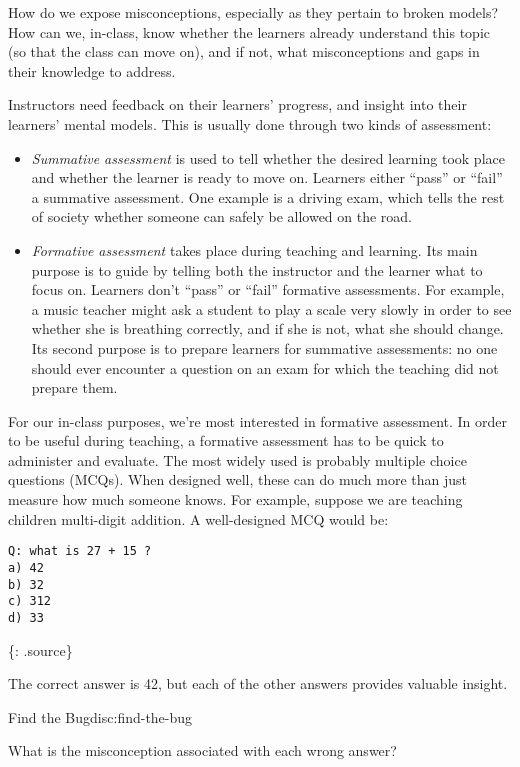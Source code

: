 How do we expose misconceptions, especially as they pertain to broken
models? How can we, in-class, know whether the learners already
understand this topic (so that the class can move on), and if not, what
misconceptions and gaps in their knowledge to address.

Instructors need feedback on their learners' progress, and insight into
their learners' mental models. This is usually done through two kinds of
assessment:

\begin{itemize}
\itemsep1pt\parskip0pt
\item
  \emph{Summative assessment} is used to tell whether the desired
  learning took place and whether the learner is ready to move on.
  Learners either ``pass'' or ``fail'' a summative assessment. One
  example is a driving exam, which tells the rest of society whether
  someone can safely be allowed on the road.
\item
  \emph{Formative assessment} takes place during teaching and learning.
  Its main purpose is to guide by telling both the instructor and the
  learner what to focus on. Learners don't ``pass'' or ``fail''
  formative assessments. For example, a music teacher might ask a
  student to play a scale very slowly in order to see whether she is
  breathing correctly, and if she is not, what she should change. Its
  second purpose is to prepare learners for summative assessments: no
  one should ever encounter a question on an exam for which the teaching
  did not prepare them.
\end{itemize}

For our in-class purposes, we're most interested in formative
assessment. In order to be useful during teaching, a formative
assessment has to be quick to administer and evaluate. The most widely
used is probably multiple choice questions (MCQs). When designed well,
these can do much more than just measure how much someone knows. For
example, suppose we are teaching children multi-digit addition. A
well-designed MCQ would be:

\begin{verbatim}
Q: what is 27 + 15 ?
a) 42
b) 32
c) 312
d) 33
\end{verbatim}

\{: .source\}

The correct answer is 42, but each of the other answers provides
valuable insight.

\begin{discussion}{Find the Bug}{disc:find-the-bug}

What is the misconception associated with each wrong answer?
\end{discussion}

